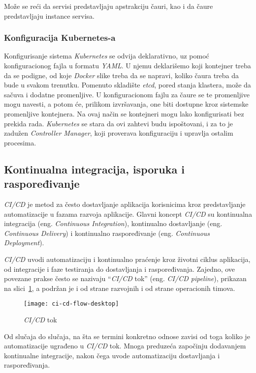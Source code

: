 Može se reći da servisi predstavljaju apstrakciju čauri, kao i da čaure predstavljaju instance servisa.

\subsubsection{Konfiguracija Kubernetes-a}
Konfigurisanje sistema \textit{Kubernetes} se odvija deklarativno, uz pomoć konfiguracionog fajla u formatu \textit{YAML}. U njemu deklarišemo
koji kontejner treba da se podigne, od koje \textit{Docker} slike treba da se napravi, koliko čaura treba 
da bude u svakom trenutku. Pomenuto skladište {\em etcd}, pored stanja klastera, može da sačuva i dodatne promenljive.
U konfiguracionom fajlu za čaure se te promenljive mogu navesti, a potom će, prilikom izvršavanja, one biti 
dostupne kroz sistemske promenljive kontejnera. Na ovaj način se kontejneri mogu lako konfigurisati bez prekida rada. 
\textit{Kubernetes} se stara da ovi zahtevi budu ispoštovani, i za to je zadužen \textit{Controller Manager}, 
koji proverava konfiguraciju i upravlja ostalim procesima. 


\subsection{Kontinualna integracija, isporuka i raspoređivanje}\label{sec:arhitektura-ci_cd}

\textit{CI/CD} je metod za često dostavljanje aplikacija korisnicima kroz predstavljanje automatizacije u 
fazama razvoja aplikacije. Glavni koncept \textit{CI/CD} su kontinualna integracija (eng. 
\textit{Continuous Integration}), kontinualno dostavljanje (eng. \textit{Continuous Delivery}) i 
kontinualno raspoređivanje (eng. \textit{Continuous Deployment}).

\textit{CI/CD} uvodi automatizaciju i kontinualno praćenje kroz životni ciklus aplikacija, 
od integracije i faze testiranja do dostavljanja i raspoređivanja. Zajedno, ove povezane prakse 
često se nazivaju “\textit{CI/CD} tok” (eng. \textit{CI/CD pipeline}), prikazan na slici~\ref{fig:cicd}, 
a podržan je i od strane razvojnih i od strane operacionih timova.

\begin{figure}[h]
    \centering
    \texttt{[image: ci-cd-flow-desktop]}
    \caption{\textit{CI/CD} tok}
    \label{fig:cicd}
\end{figure}

Od slučaja do slučaja, na šta se termini konkretno odnose zavisi od toga koliko je automatizacije 
ugrađeno u \textit{CI/CD} tok. Mnoga preduzeća započinju dodavanjem kontinualne integracije, 
nakon čega uvode automatizaciju dostavljanja i raspoređivanja.

